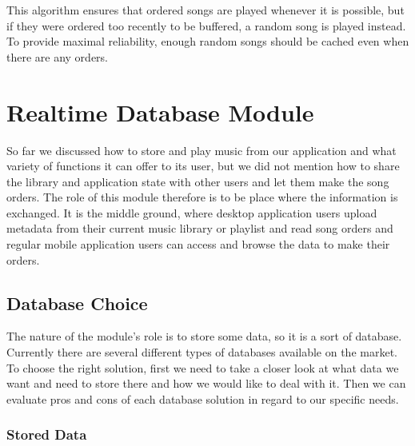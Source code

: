 This algorithm ensures that ordered songs are played whenever it is possible, but if they were ordered too recently to be buffered, a random song is played instead. To provide maximal reliability, enough random songs should be cached even when there are any orders.

\section {Realtime Database Module}

So far we discussed how to store and play music from our application and what variety of functions it can offer to its user, but we did not mention how to share the library and application state with other users and let them make the song orders. The role of this module therefore is to be place where the information is exchanged. It is the middle ground, where desktop application users upload metadata from their current music library or playlist and read song orders and regular mobile application users can access and browse the data to make their orders.

\subsection{Database Choice}

The nature of the module's role is to store some data, so it is a sort of database. Currently there are several different types of databases available on the market. To choose the right solution, first we need to take a closer look at what data we want and need to store there and how we would like to deal with it. Then we can evaluate pros and cons of each database solution in regard to our specific needs.

\subsubsection{Stored Data}

